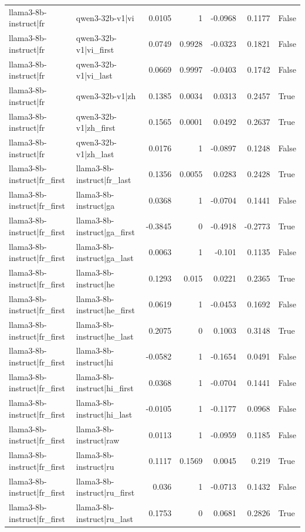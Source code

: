 \begin{table}
\begin{tabular}{l l r r r r l}
llama3-8b-instruct|fr & qwen3-32b-v1|vi & 0.0105 & 1 & -0.0968 & 0.1177 & False \\
llama3-8b-instruct|fr & qwen3-32b-v1|vi_first & 0.0749 & 0.9928 & -0.0323 & 0.1821 & False \\
llama3-8b-instruct|fr & qwen3-32b-v1|vi_last & 0.0669 & 0.9997 & -0.0403 & 0.1742 & False \\
llama3-8b-instruct|fr & qwen3-32b-v1|zh & 0.1385 & 0.0034 & 0.0313 & 0.2457 & True \\
llama3-8b-instruct|fr & qwen3-32b-v1|zh_first & 0.1565 & 0.0001 & 0.0492 & 0.2637 & True \\
llama3-8b-instruct|fr & qwen3-32b-v1|zh_last & 0.0176 & 1 & -0.0897 & 0.1248 & False \\
llama3-8b-instruct|fr_first & llama3-8b-instruct|fr_last & 0.1356 & 0.0055 & 0.0283 & 0.2428 & True \\
llama3-8b-instruct|fr_first & llama3-8b-instruct|ga & 0.0368 & 1 & -0.0704 & 0.1441 & False \\
llama3-8b-instruct|fr_first & llama3-8b-instruct|ga_first & -0.3845 & 0 & -0.4918 & -0.2773 & True \\
llama3-8b-instruct|fr_first & llama3-8b-instruct|ga_last & 0.0063 & 1 & -0.101 & 0.1135 & False \\
llama3-8b-instruct|fr_first & llama3-8b-instruct|he & 0.1293 & 0.015 & 0.0221 & 0.2365 & True \\
llama3-8b-instruct|fr_first & llama3-8b-instruct|he_first & 0.0619 & 1 & -0.0453 & 0.1692 & False \\
llama3-8b-instruct|fr_first & llama3-8b-instruct|he_last & 0.2075 & 0 & 0.1003 & 0.3148 & True \\
llama3-8b-instruct|fr_first & llama3-8b-instruct|hi & -0.0582 & 1 & -0.1654 & 0.0491 & False \\
llama3-8b-instruct|fr_first & llama3-8b-instruct|hi_first & 0.0368 & 1 & -0.0704 & 0.1441 & False \\
llama3-8b-instruct|fr_first & llama3-8b-instruct|hi_last & -0.0105 & 1 & -0.1177 & 0.0968 & False \\
llama3-8b-instruct|fr_first & llama3-8b-instruct|raw & 0.0113 & 1 & -0.0959 & 0.1185 & False \\
llama3-8b-instruct|fr_first & llama3-8b-instruct|ru & 0.1117 & 0.1569 & 0.0045 & 0.219 & True \\
llama3-8b-instruct|fr_first & llama3-8b-instruct|ru_first & 0.036 & 1 & -0.0713 & 0.1432 & False \\
llama3-8b-instruct|fr_first & llama3-8b-instruct|ru_last & 0.1753 & 0 & 0.0681 & 0.2826 & True \\

\end{tabular}
\end{table}
